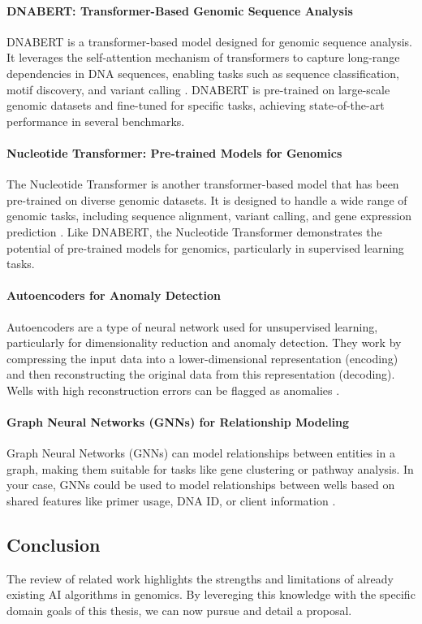 \paragraph{DNABERT: Transformer-Based Genomic Sequence Analysis}
DNABERT is a transformer-based model designed for genomic sequence analysis. It leverages the self-attention mechanism of transformers to capture long-range dependencies in DNA sequences, enabling tasks such as sequence classification, motif discovery, and variant calling \cite{ji2021dnabert}. DNABERT is pre-trained on large-scale genomic datasets and fine-tuned for specific tasks, achieving state-of-the-art performance in several benchmarks. 

\paragraph{Nucleotide Transformer: Pre-trained Models for Genomics}
The Nucleotide Transformer is another transformer-based model that has been pre-trained on diverse genomic datasets. It is designed to handle a wide range of genomic tasks, including sequence alignment, variant calling, and gene expression prediction \cite{dalla2023nucleotide}. Like DNABERT, the Nucleotide Transformer demonstrates the potential of pre-trained models for genomics, particularly in supervised learning tasks.

\paragraph{Autoencoders for Anomaly Detection}
Autoencoders are a type of neural network used for unsupervised learning, particularly for dimensionality reduction and anomaly detection. They work by compressing the input data into a lower-dimensional representation (encoding) and then reconstructing the original data from this representation (decoding). Wells with high reconstruction errors can be flagged as anomalies \cite{kingma2013autoencoding}.

\paragraph{Graph Neural Networks (GNNs) for Relationship Modeling}
Graph Neural Networks (GNNs) can model relationships between entities in a graph, making them suitable for tasks like gene clustering or pathway analysis. In your case, GNNs could be used to model relationships between wells based on shared features like primer usage, DNA ID, or client information \cite{kipf2016semi}.
\subsection{Conclusion}
The review of related work highlights the strengths and limitations of already existing AI algorithms in genomics. By levereging this knowledge with the specific domain goals of this thesis, we can now pursue and detail a proposal.